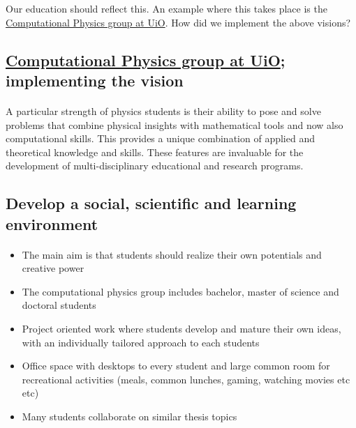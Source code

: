 \documentclass[%
oneside,                 %
final,                   %
10pt]{article}
\begin{document}
\noindent
Our education should reflect this. An example where this takes place is the \href{{http://www.mn.uio.no/fysikk/english/research/groups/computational/index.html}}{Computational Physics group at UiO}.  How did we implement the above visions?




\subsection{\href{{http://www.mn.uio.no/fysikk/english/research/groups/computational/index.html}}{Computational Physics group at UiO}; implementing the vision}

\paragraph{}
A particular strength of physics students is their ability to pose and
solve problems that combine physical insights with mathematical tools
and now also computational skills. This provides a unique combination
of applied and theoretical knowledge and skills. These features are invaluable 
for the development of multi-disciplinary educational and research programs.




\subsection{Develop a social, scientific and learning environment}

\paragraph{}
\begin{itemize}
\item The main aim is that students should realize their own potentials and creative power

\item The computational physics group includes bachelor, master of science and doctoral students

\item Project oriented work where students develop and mature their own ideas, with an individually tailored approach to each students

\item Office space with desktops to every student and large common room for recreational activities (meals, common lunches, gaming, watching movies etc etc)

\item Many students collaborate on similar  thesis topics
\end{itemize}
\end{document}
